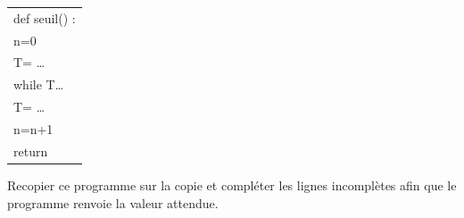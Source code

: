 \documentclass[10pt]{article}
\providecommand{\dotfill}{\ldots}
\begin{document}
\begin{enumerate}
\begin{enumerate}
\begin{minipage}[]{5cm}
\begin{tabular}[]{|p{4.5cm}|}
\hline
def seuil() :\\
\hspace{1.2em}n=0\\
\hspace{1.2em}T= \dotfill\\
\hspace{1.2em}while T\dotfill\\
\hspace{4em}T= \dotfill\\
\hspace{4em}n=n+1\\
\hspace{1.2em}return\\
\hline
\end{tabular}
\end{minipage}
\hspace{1.5cm}
\begin{minipage}[]{5.6cm}
Recopier ce programme sur la copie
et compléter les lignes incomplètes
afin que le programme renvoie la valeur attendue.
\end{minipage}
\end{enumerate}
\end{enumerate}


 \vspace{0.5cm}
\end{document}
